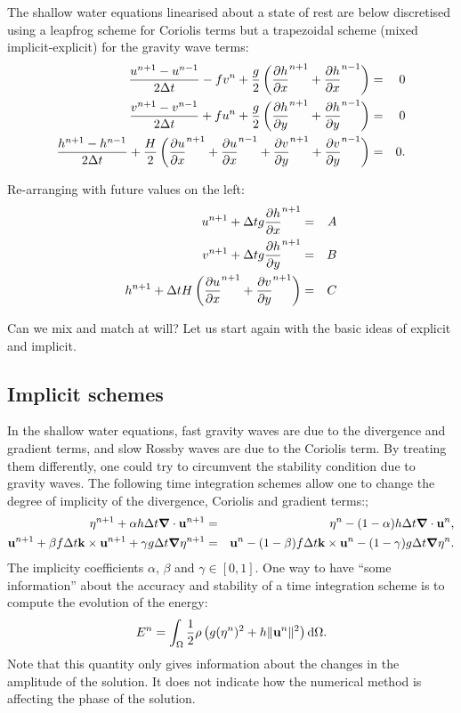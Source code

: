 The shallow water equations linearised about a state of rest are below
discretised using a leapfrog scheme for Coriolis terms but a
trapezoidal scheme (mixed implicit-explicit) for the gravity wave
terms:
\begin{eqnarray*}
	\frac{u^{n+1}-u^{n-1}}{2\Delta t}-fv^n+\frac{g}{2}
	\left( \frac{\partial h}{\partial x}^{n+1} +\frac{\partial h}{\partial x}^{n-1} \right) & = & 0 \\
	\frac{v^{n+1}-v^{n-1}}{2\Delta t}+fu^n+\frac{g}{2}
	\left( \frac{\partial h}{\partial y}^{n+1} +\frac{\partial h}{\partial y}^{n-1} \right) & = & 0 \\
	\frac{h^{n+1}-h^{n-1}}{2\Delta t}+\frac{H}{2}
	\left( \frac{\partial u}{\partial x}^{n+1} +\frac{\partial u}{\partial x}^{n-1}
	+\frac{\partial v}{\partial y}^{n+1} +\frac{\partial v}{\partial y}^{n-1} 
	\right) & = & 0. 
\end{eqnarray*}

Re-arranging with future values on the left:
\begin{eqnarray*}
	u^{n+1}+\Delta t g \frac{\partial h}{\partial x}^{n+1} & = & A \\
	v^{n+1}+\Delta t g \frac{\partial h}{\partial y}^{n+1} & = & B \\
	h^{n+1}+\Delta t H \left( \frac{\partial u}{\partial x}^{n+1}+\frac{\partial v}{\partial y}^{n+1} \right) & = & C
\end{eqnarray*}

Can we mix and match at will? Let us start again with the basic ideas of explicit and implicit.


\subsection{Implicit schemes}

In the shallow water equations, fast gravity waves are due to the divergence and gradient terms, and slow Rossby waves are due to the Coriolis term. By treating them differently, one could try to circumvent the stability condition due to gravity waves. The following time integration schemes allow one to change the degree of implicity of the divergence, Coriolis and gradient terms:;
\begin{eqnarray*}
	\eta^{n+1} + \alpha h \Delta t \mbox{\boldmath $\nabla$} \cdot \mathbf{u}^{n+1} &=& \eta^n - (1-\alpha) h \Delta t \mbox{\boldmath $\nabla$} \cdot \mathbf{u}^n,
	\\
	\mathbf{u}^{n+1} + \beta f \Delta t \mathbf{k} \times \mathbf{u}^{n+1} + \gamma g \Delta t \mbox{\boldmath $\nabla$} \eta^{n+1} &=& \mathbf{u}^n - (1-\beta) f \Delta t \mathbf{k} \times \mathbf{u}^n - (1-\gamma) g \Delta t \mbox{\boldmath $\nabla$} \eta^n.
\end{eqnarray*}
The implicity coefficients $\alpha$, $\beta$ and $\gamma \in [0,1]$. One way to have ``some information'' about the accuracy and stability of a time integration scheme is to compute the evolution of the energy:
\[
E^n = \int_{\Omega} \frac{1}{2} \rho \left( g (\eta^n)^2 + h \|\mathbf{u}^n\|^2 \right) \mathop{\mathrm{{}d}}\mathopen{} \Omega.
\]
Note that this quantity only gives information about the changes in the amplitude of the solution. It does not indicate how the numerical method is affecting the phase of the solution.


